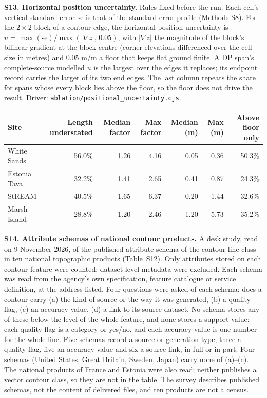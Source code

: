 \documentclass[11pt]{article}
\begin{document}
\vspace{4mm}
\noindent\textbf{S13. Horizontal position uncertainty.} Rules fixed before the run. Each cell's vertical standard error $\mathrm{se}$ is that of the standard-error profile (Methods S8). For the $2\times2$ block of a contour edge, the horizontal position uncertainty is $u=\max(\mathrm{se})/\max(|\nabla z|,\,0.05)$, with $|\nabla z|$ the magnitude of the block's bilinear gradient at the block centre (corner elevations differenced over the cell size in metres) and 0.05 m/m a floor that keeps flat ground finite. A DP span's complete-source modelled $u$ is the largest over the edges it replaces; its endpoint record carries the larger of its two end edges. The last column repeats the share for spans whose every block lies above the floor, so the floor does not drive the result. Driver: \texttt{ablation/positional\_uncertainty.cjs}.

\begin{center}\scriptsize
\begin{tabular}{@{}lrrrrrr@{}}
\toprule
Site & Length understated & Median factor & Max factor & Median (m) & Max (m) & Above floor only \\
\midrule
White Sands & 56.0\% & 1.26 & 4.16 & 0.05 & 0.36 & 50.3\% \\
Estonia Tava & 32.2\% & 1.41 & 2.65 & 0.41 & 0.87 & 24.3\% \\
StREAM & 40.5\% & 1.65 & 6.37 & 0.20 & 1.44 & 32.6\% \\
Marsh Island & 28.8\% & 1.20 & 2.46 & 1.20 & 5.73 & 35.2\% \\
\bottomrule
\end{tabular}
\end{center}

\noindent\textbf{S14. Attribute schemas of national contour products.} A desk study, read on 9 November 2026, of the published attribute schema of the contour-line class in ten national topographic products (Table~S12). Only attributes stored on each contour feature were counted; dataset-level metadata were excluded. Each schema was read from the agency's own specification, feature catalogue or service definition, at the address listed. Four questions were asked of each schema: does a contour carry (a) the kind of source or the way it was generated, (b) a quality flag, (c) an accuracy value, (d) a link to its source dataset. No schema stores any of these below the level of the whole feature, and none stores a support value: each quality flag is a category or yes/no, and each accuracy value is one number for the whole line. Five schemas record a source or generation type, three a quality flag, five an accuracy value and six a source link, in full or in part. Four schemas (United States, Great Britain, Sweden, Japan) carry none of (a)--(c). The national products of France and Estonia were also read; neither publishes a vector contour class, so they are not in the table. The survey describes published schemas, not the content of delivered files, and ten products are not a census.
\end{document}
